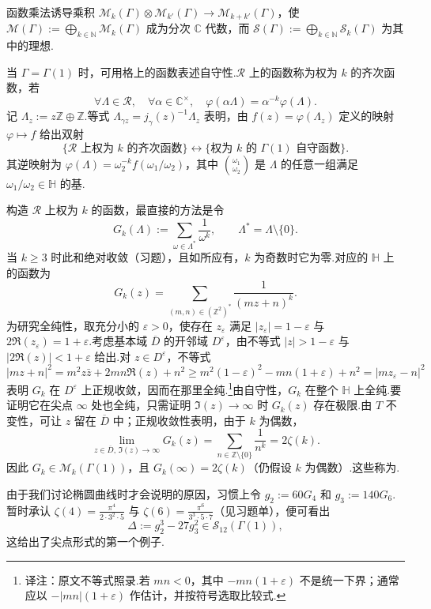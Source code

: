 \begin{remark*}
函数乘法诱导乘积 $\mathcal M_k(\Gamma)\otimes\mathcal M_{k'}(\Gamma)\longrightarrow\mathcal M_{k+k'}(\Gamma)$，使 $\mathcal M(\Gamma):=\bigoplus_{k\in\mathbb N}\mathcal M_k(\Gamma)$ 成为分次 $\mathbb C$ 代数，而 $\mathcal S(\Gamma):=\bigoplus_{k\in\mathbb N}\mathcal S_k(\Gamma)$ 为其中的理想.
\end{remark*}
\begin{remark*}
当 $\Gamma=\Gamma(1)$ 时，可用格上的函数表述自守性.$\mathcal R$ 上的函数称为权为 $k$ 的齐次函数，若
\[
\forall\Lambda\in\mathcal R,\quad\forall\alpha\in\mathbb C^\times,\quad\varphi(\alpha\Lambda)=\alpha^{-k}\varphi(\Lambda).
\]
记 $\Lambda_z:=z\mathbb Z\oplus\mathbb Z$.等式 $\Lambda_{\gamma z}=j_\gamma(z)^{-1}\Lambda_z$ 表明，由 $f(z)=\varphi(\Lambda_z)$ 定义的映射 $\varphi\mapsto f$ 给出双射
\[
\{\mathcal R\text{ 上权为 }k\text{ 的齐次函数}\}\longleftrightarrow\{\text{权为 }k\text{ 的 }\Gamma(1)\text{ 自守函数}\}.
\]
其逆映射为 $\varphi(\Lambda)=\omega_2^{-k}f(\omega_1/\omega_2)$，其中 $\binom{\omega_1}{\omega_2}$ 是 $\Lambda$ 的任意一组满足 $\omega_1/\omega_2\in\mathbb H$ 的基.
\end{remark*}
\begin{example*}[{Eisenstein 级数}]
构造 $\mathcal R$ 上权为 $k$ 的函数，最直接的方法是令
\[
G_k(\Lambda):=\sum_{\omega\in\Lambda^*}\frac1{\omega^k},\qquad\Lambda^*=\Lambda\setminus\{0\}.
\]
当 $k\ge3$ 时此和绝对收敛（习题），且如所应有，$k$ 为奇数时它为零.对应的 $\mathbb H$ 上的函数为
\[
G_k(z)=\sum_{(m,n)\in(\mathbb Z^2)^*}\frac1{(mz+n)^k}.
\]
为研究全纯性，取充分小的 $\varepsilon>0$，使存在 $z_\varepsilon$ 满足 $|z_\varepsilon|=1-\varepsilon$ 与 $2\Re(z_\varepsilon)=1+\varepsilon$.考虑基本域 $\overline D$ 的开邻域 $D^\varepsilon$，由不等式 $|z|>1-\varepsilon$ 与 $|2\Re(z)|<1+\varepsilon$ 给出.对 $z\in D^\varepsilon$，不等式
\[
|mz+n|^2=m^2z\bar z+2mn\Re(z)+n^2\ge m^2(1-\varepsilon)^2-mn(1+\varepsilon)+n^2=|mz_\varepsilon-n|^2
\]
表明 $G_k$ 在 $D^\varepsilon$ 上正规收敛，因而在那里全纯.\footnote{译注：原文不等式照录.若 $mn<0$，其中 $-mn(1+\varepsilon)$ 不是统一下界；通常应以 $-|mn|(1+\varepsilon)$ 作估计，并按符号选取比较式.}由自守性，$G_k$ 在整个 $\mathbb H$ 上全纯.要证明它在尖点 $\infty$ 处也全纯，只需证明 $\Im(z)\to\infty$ 时 $G_k(z)$ 存在极限.由 $T$ 不变性，可让 $z$ 留在 $\overline D$ 中；正规收敛性表明，由于 $k$ 为偶数，
\[
\lim_{z\in\overline D,\,\Im(z)\to\infty}G_k(z)=\sum_{n\in\mathbb Z\setminus\{0\}}\frac1{n^k}=2\zeta(k).
\]
因此 $G_k\in\mathcal M_k(\Gamma(1))$，且 $G_k(\infty)=2\zeta(k)$（仍假设 $k$ 为偶数）.这些称为.
\end{example*}
\begin{example*}[{$\Delta$ 函数}]
由于我们讨论椭圆曲线时才会说明的原因，习惯上令 $g_2:=60G_4$ 和 $g_3:=140G_6$.暂时承认 $\zeta(4)=\frac{\pi^4}{2\cdot3^2\cdot5}$ 与 $\zeta(6)=\frac{\pi^6}{3^3\cdot5\cdot7}$（见习题单），便可看出
\[
\Delta:=g_2^3-27g_3^2\in\mathcal S_{12}(\Gamma(1)),
\]
这给出了尖点形式的第一个例子.
\end{example*}
